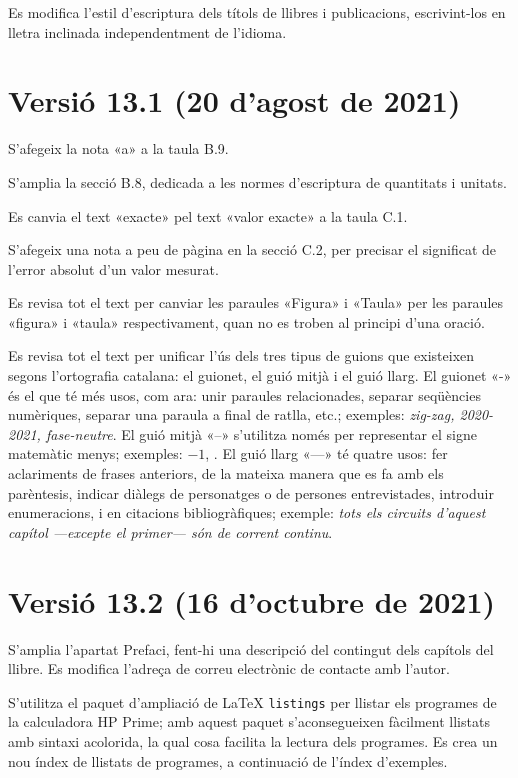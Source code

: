 Es modifica l'estil d'escriptura dels títols de llibres i publicacions, escrivint-los en lletra inclinada independentment de l'idioma.


\section*{Versió 13.1 (20 d'agost de 2021)}

S'afegeix la nota «a» a la taula B.9.

S'amplia la secció B.8, dedicada a les normes d'escriptura de quantitats i unitats.

Es canvia el text «exacte» pel text «valor exacte» a la taula C.1.

S'afegeix una nota a peu de pàgina en la secció C.2, per precisar el significat de l'error absolut d'un valor mesurat.

Es revisa tot el text per canviar les paraules «Figura» i «Taula» per les paraules «figura» i «taula» respectivament, quan no es troben al principi d'una oració.

Es revisa tot el text per unificar l'ús dels tres tipus de guions que existeixen segons l'ortografia catalana: el guionet, el guió mitjà i el guió llarg. El guionet  «-» és el que té més usos, com ara:  unir paraules relacionades, separar seqüències numèriques, separar una paraula a final de ratlla, etc.; exemples: \textit{zig-zag, 2020-2021, fase-neutre}. El guió mitjà  «--» s'utilitza només per representar el signe matemàtic menys; exemples: $-1$, . El  guió llarg  «---» té quatre usos: fer aclariments de frases anteriors, de la mateixa manera que es fa amb els parèntesis, indicar diàlegs de personatges o de persones entrevistades, introduir enumeracions, i en citacions bibliogràfiques; exemple: \textit{tots els circuits d'aquest capítol ---excepte el primer--- són de corrent continu}.


\section*{Versió 13.2 (16 d'octubre de 2021)}

S'amplia l'apartat Prefaci, fent-hi una descripció del contingut dels capítols del llibre. Es modifica l'adreça de correu electrònic de contacte amb l'autor.

S'utilitza el paquet d'ampliació de \LaTeX{} \texttt{listings} per llistar els programes de la calculadora \textsf{HP Prime}; amb aquest paquet s'aconsegueixen fàcilment  llistats amb sintaxi acolorida, la qual cosa facilita la lectura dels programes. Es crea un nou índex de llistats de programes, a continuació de l'índex d'exemples.


